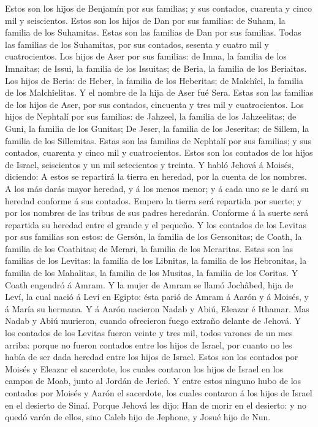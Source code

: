  Estos son los hijos de Benjamín por sus familias; y sus
contados, cuarenta y cinco mil y seiscientos.  Estos son
los hijos de Dan por sus familias: de Suham, la familia de los
Suhamitas. Estas son las familias de Dan por sus familias.
 Todas las familias de los Suhamitas, por sus contados,
sesenta y cuatro mil y cuatrocientos.  Los hijos de Aser
por sus familias: de Imna, la familia de los Imnaitas; de Issui, la
familia de los Issuitas; de Beria, la familia de los Beriaitas.
 Los hijos de Beria: de Heber, la familia de los
Heberitas; de Malchîel, la familia de los Malchîelitas. 
Y el nombre de la hija de Aser fué Sera.  Estas son las
familias de los hijos de Aser, por sus contados, cincuenta y tres mil y
cuatrocientos.  Los hijos de Nephtalí por sus familias:
de Jahzeel, la familia de los Jahzeelitas; de Guni, la familia de los
Gunitas;  De Jeser, la familia de los Jeseritas; de
Sillem, la familia de los Sillemitas.  Estas son las
familias de Nephtalí por sus familias; y sus contados, cuarenta y cinco
mil y cuatrocientos.  Estos son los contados de los hijos
de Israel, seiscientos y un mil setecientos y treinta.  Y
habló Jehová á Moisés, diciendo:  A estos se repartirá la
tierra en heredad, por la cuenta de los nombres.  A los
más darás mayor heredad, y á los menos menor; y á cada uno se le dará su
heredad conforme á sus contados.  Empero la tierra será
repartida por suerte; y por los nombres de las tribus de sus padres
heredarán.  Conforme á la suerte será repartida su
heredad entre el grande y el pequeño.  Y los contados de
los Levitas por sus familias son estos: de Gersón, la familia de los
Gersonitas; de Coath, la familia de los Coathitas; de Merari, la familia
de los Meraritas.  Estas son las familias de los Levitas:
la familia de los Libnitas, la familia de los Hebronitas, la familia de
los Mahalitas, la familia de los Musitas, la familia de los Coritas. Y
Coath engendró á Amram.  Y la mujer de Amram se llamó
Jochâbed, hija de Leví, la cual nació á Leví en Egipto: ésta parió de
Amram á Aarón y á Moisés, y á María su hermana.  Y á
Aarón nacieron Nadab y Abiú, Eleazar é Ithamar.  Mas
Nadab y Abiú murieron, cuando ofrecieron fuego extraño delante de
Jehová.  Y los contados de los Levitas fueron veinte y
tres mil, todos varones de un mes arriba: porque no fueron contados
entre los hijos de Israel, por cuanto no les había de ser dada heredad
entre los hijos de Israel.  Estos son los contados por
Moisés y Eleazar el sacerdote, los cuales contaron los hijos de Israel
en los campos de Moab, junto al Jordán de Jericó.  Y
entre estos ninguno hubo de los contados por Moisés y Aarón el
sacerdote, los cuales contaron á los hijos de Israel en el desierto de
Sinaí.  Porque Jehová les dijo: Han de morir en el
desierto: y no quedó varón de ellos, sino Caleb hijo de Jephone, y Josué
hijo de Nun.

